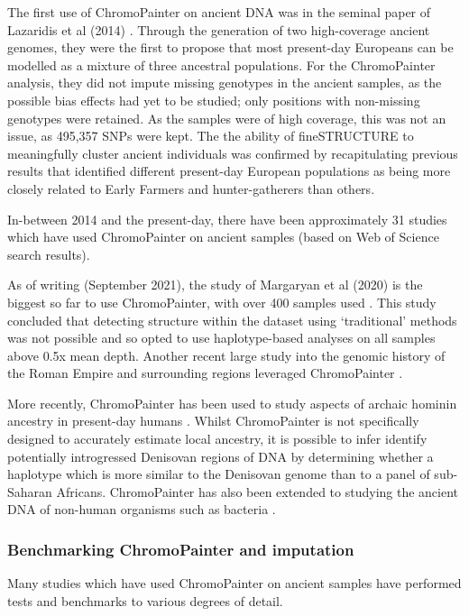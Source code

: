The first use of ChromoPainter on ancient DNA was in the seminal paper of Lazaridis et al (2014) \cite{Lazaridis2014}. Through the generation of two high-coverage ancient genomes, they were the first to propose that most present-day Europeans can be modelled as a mixture of three ancestral populations. For the ChromoPainter analysis, they did not impute missing genotypes in the ancient samples, as the possible bias effects had yet to be studied; only positions with non-missing genotypes were retained. As the samples were of high coverage, this was not an issue, as 495,357 SNPs were kept. The the ability of fineSTRUCTURE to meaningfully cluster ancient individuals was confirmed by recapitulating previous results that identified different present-day European populations as being more closely related to Early Farmers and hunter-gatherers than others. 

In-between 2014 and the present-day, there have been approximately 31 studies which have used ChromoPainter on ancient samples (based on Web of Science search results). 

As of writing (September 2021), the study of Margaryan et al (2020) is the biggest so far to use ChromoPainter, with over 400 samples used \cite{margaryan2020population}. This study concluded that detecting structure within the dataset using `traditional' methods was not possible and so opted to use haplotype-based analyses on all samples above 0.5x mean depth. Another recent large study into the genomic history of the Roman Empire and surrounding regions leveraged ChromoPainter \cite{antonio2019ancient}.

More recently, ChromoPainter has been used to study aspects of archaic hominin ancestry in present-day humans \cite{JACOBS20191010, teixeira2021widespread}. Whilst ChromoPainter is not specifically designed to accurately estimate local ancestry, it is possible to infer identify potentially introgressed Denisovan regions of DNA by determining whether a haplotype which is more similar to the Denisovan genome than to a panel of sub-Saharan Africans. ChromoPainter has also been extended to studying the ancient DNA of non-human organisms such as bacteria \cite{Moodleye2015523118}. 

\subsubsection{Benchmarking ChromoPainter and imputation}

Many studies which have used ChromoPainter on ancient samples have performed tests and benchmarks to various degrees of detail. 

